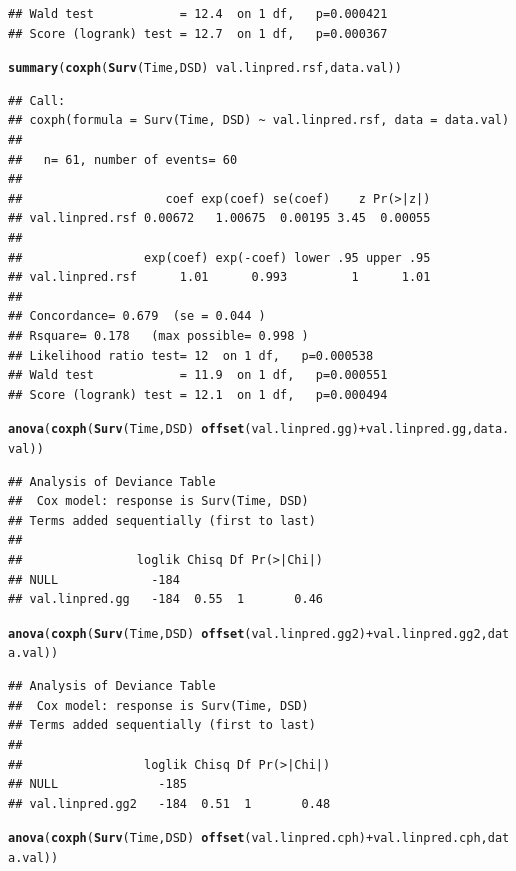 \documentclass{article}\usepackage[]{graphicx}\usepackage[]{color}
\makeatletter
\newcommand{\hlopt}[1]{\textcolor[rgb]{0,0,0}{#1}}%
\newcommand{\hlstd}[1]{\textcolor[rgb]{0.345,0.345,0.345}{#1}}%
\newcommand{\hlkwd}[1]{\textcolor[rgb]{0.737,0.353,0.396}{\textbf{#1}}}%
\newenvironment{kframe}{%
 \def\at@end@of@kframe{}%
 \ifinner\ifhmode%
  \def\at@end@of@kframe{\end{minipage}}%
  \begin{minipage}{\columnwidth}%
 \fi\fi%
 \def\FrameCommand##1{\hskip\@totalleftmargin \hskip-\fboxsep
 \colorbox{shadecolor}{##1}\hskip-\fboxsep
     \hskip-\linewidth \hskip-\@totalleftmargin \hskip\columnwidth}%
 \MakeFramed {\advance\hsize-\width
   \@totalleftmargin\z@ \linewidth\hsize
   \@setminipage}}%
 {\par\unskip\endMakeFramed%
 \at@end@of@kframe}
\newenvironment{knitrout}{}{} %
\makeatother
\begin{document}
\begin{knitrout}
\begin{kframe}
\begin{verbatim}
## Wald test            = 12.4  on 1 df,   p=0.000421
## Score (logrank) test = 12.7  on 1 df,   p=0.000367
\end{verbatim}
\begin{alltt}
\hlkwd{summary}\hlstd{(}\hlkwd{coxph}\hlstd{(}\hlkwd{Surv}\hlstd{(Time, DSD)} \hlopt{~} \hlstd{val.linpred.rsf, data.val))}
\end{alltt}
\begin{verbatim}
## Call:
## coxph(formula = Surv(Time, DSD) ~ val.linpred.rsf, data = data.val)
## 
##   n= 61, number of events= 60 
## 
##                    coef exp(coef) se(coef)    z Pr(>|z|)
## val.linpred.rsf 0.00672   1.00675  0.00195 3.45  0.00055
## 
##                 exp(coef) exp(-coef) lower .95 upper .95
## val.linpred.rsf      1.01      0.993         1      1.01
## 
## Concordance= 0.679  (se = 0.044 )
## Rsquare= 0.178   (max possible= 0.998 )
## Likelihood ratio test= 12  on 1 df,   p=0.000538
## Wald test            = 11.9  on 1 df,   p=0.000551
## Score (logrank) test = 12.1  on 1 df,   p=0.000494
\end{verbatim}
\begin{alltt}
\hlkwd{anova}\hlstd{(}\hlkwd{coxph}\hlstd{(}\hlkwd{Surv}\hlstd{(Time, DSD)} \hlopt{~} \hlkwd{offset}\hlstd{(val.linpred.gg)} \hlopt{+} \hlstd{val.linpred.gg, data.val))}
\end{alltt}
\begin{verbatim}
## Analysis of Deviance Table
##  Cox model: response is Surv(Time, DSD)
## Terms added sequentially (first to last)
## 
##                loglik Chisq Df Pr(>|Chi|)
## NULL             -184                    
## val.linpred.gg   -184  0.55  1       0.46
\end{verbatim}
\begin{alltt}
\hlkwd{anova}\hlstd{(}\hlkwd{coxph}\hlstd{(}\hlkwd{Surv}\hlstd{(Time, DSD)} \hlopt{~} \hlkwd{offset}\hlstd{(val.linpred.gg2)} \hlopt{+} \hlstd{val.linpred.gg2, data.val))}
\end{alltt}
\begin{verbatim}
## Analysis of Deviance Table
##  Cox model: response is Surv(Time, DSD)
## Terms added sequentially (first to last)
## 
##                 loglik Chisq Df Pr(>|Chi|)
## NULL              -185                    
## val.linpred.gg2   -184  0.51  1       0.48
\end{verbatim}
\begin{alltt}
\hlkwd{anova}\hlstd{(}\hlkwd{coxph}\hlstd{(}\hlkwd{Surv}\hlstd{(Time, DSD)} \hlopt{~} \hlkwd{offset}\hlstd{(val.linpred.cph)} \hlopt{+} \hlstd{val.linpred.cph, data.val))}

\end{alltt}
\end{kframe}
\end{knitrout}
\end{document}

